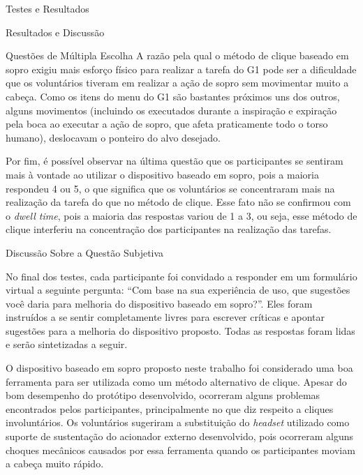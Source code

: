 \begin{chapter}{Testes e Resultados}
\begin{section}{Resultados e Discussão}
\begin{subsection}{Questões de Múltipla Escolha}
A razão pela qual o método de clique baseado em sopro exigiu mais esforço físico
para realizar a tarefa do G1 pode ser a dificuldade que os voluntários tiveram
em realizar a ação de sopro sem movimentar muito a cabeça. Como os itens do menu
do G1 são bastantes próximos uns dos outros, alguns movimentos (incluindo os
executados durante a inspiração e expiração pela boca ao executar a ação de
sopro, que afeta praticamente todo o torso humano), deslocavam o ponteiro do
alvo desejado.

Por fim, é possível observar na última questão que os participantes se sentiram
mais à vontade ao utilizar o dispositivo baseado em sopro, pois a maioria
respondeu 4 ou 5, o que significa que os voluntários se concentraram mais na
realização da tarefa do que no método de clique. Esse fato não se confirmou com o
\textit{dwell time}, pois a maioria das respostas variou de 1 a 3, ou seja, esse
método de clique interferiu na concentração dos participantes na realização das
tarefas. 

\end{subsection}

\begin{subsection}{Discussão Sobre a Questão Subjetiva}

No final dos testes, cada participante foi convidado a responder em um
formulário virtual a seguinte pergunta: ``Com base na sua experiência de uso,
que sugestões você daria para melhoria do dispositivo baseado em sopro?''. Eles 
foram instruídos a se sentir completamente livres para escrever críticas e 
apontar sugestões para a melhoria do dispositivo proposto. Todas as respostas
foram lidas e serão sintetizadas a seguir.


O dispositivo baseado em sopro proposto neste trabalho foi considerado uma boa
ferramenta para ser utilizada como um método alternativo de clique. Apesar do
bom desempenho do protótipo desenvolvido, ocorreram alguns problemas encontrados
pelos participantes, principalmente no que diz respeito a cliques involuntários.
Os voluntários sugeriram a substituição do \textit{headset} utilizado como
suporte de sustentação do acionador externo desenvolvido, pois ocorreram alguns
choques mecânicos causados por essa ferramenta quando os participantes moviam
a cabeça muito rápido.


\end{subsection}
\end{section}
\end{chapter}
